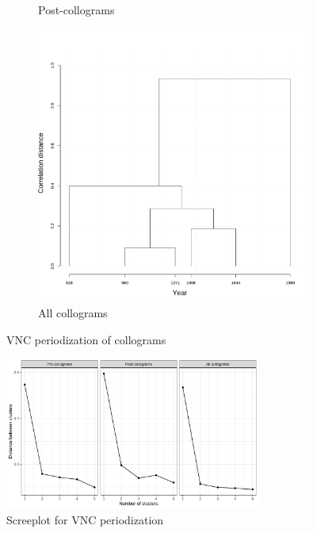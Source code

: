 \begin{figure}[H]
\begin{subfigure}{0.3\textwidth}
    \caption{Post-collograms}
  \end{subfigure}
  \quad
  \begin{subfigure}{0.3\textwidth}
    \includegraphics[width=\linewidth]{figures_new/VNC_lanbox/all_collocate_df_VNC_cor.pdf}
    \caption{All collograms}
  \end{subfigure}
  \caption{VNC periodization of collograms} \label{fig:collogram_VNC}
\end{figure}

\begin{figure}[H]
  \centering
  \includegraphics[width=0.75\textwidth,keepaspectratio]{figures_new/VNC_lanbox/screeplot_collocate.pdf}
  \caption{Screeplot for VNC periodization} \label{fig:collogram_screeplot}
\end{figure}

